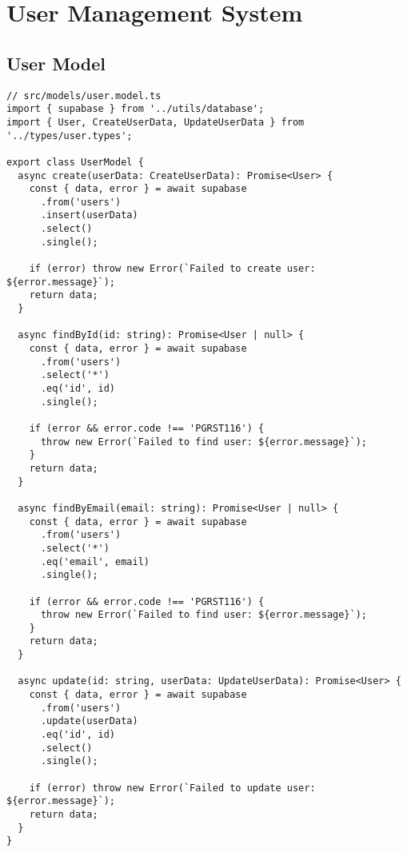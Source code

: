 \documentclass[12pt,a4paper]{article}
\begin{document}
\section{User Management System}

\subsection{User Model}
\begin{lstlisting}[caption=User Data Access Model]
// src/models/user.model.ts
import { supabase } from '../utils/database';
import { User, CreateUserData, UpdateUserData } from '../types/user.types';

export class UserModel {
  async create(userData: CreateUserData): Promise<User> {
    const { data, error } = await supabase
      .from('users')
      .insert(userData)
      .select()
      .single();

    if (error) throw new Error(`Failed to create user: ${error.message}`);
    return data;
  }

  async findById(id: string): Promise<User | null> {
    const { data, error } = await supabase
      .from('users')
      .select('*')
      .eq('id', id)
      .single();

    if (error && error.code !== 'PGRST116') {
      throw new Error(`Failed to find user: ${error.message}`);
    }
    return data;
  }

  async findByEmail(email: string): Promise<User | null> {
    const { data, error } = await supabase
      .from('users')
      .select('*')
      .eq('email', email)
      .single();

    if (error && error.code !== 'PGRST116') {
      throw new Error(`Failed to find user: ${error.message}`);
    }
    return data;
  }

  async update(id: string, userData: UpdateUserData): Promise<User> {
    const { data, error } = await supabase
      .from('users')
      .update(userData)
      .eq('id', id)
      .select()
      .single();

    if (error) throw new Error(`Failed to update user: ${error.message}`);
    return data;
  }
}
\end{lstlisting}
\end{document}
